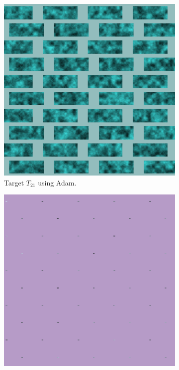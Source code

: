 \begin{figure}
\centering
\begin{subfigure}{.25\textwidth}
    \centering
    \includegraphics[width=\linewidth]{img/evaluation/M2/2param/MSE_Adam_final_render.png}
    \caption{Target $T_{21}$ using Adam.}
    \label{fig:M2MSEFinalRenders2paramAdam}
\end{subfigure}\hspace{0.7cm}
\begin{subfigure}{.25\textwidth}
    \centering
    \includegraphics[width=\linewidth]{img/evaluation/M2/random/MSE_Adam_random_final_render.png}

\end{subfigure}
\end{figure}
